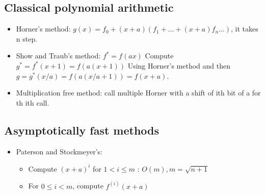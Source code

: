 \documentclass[a4paper,12pt]{article}
\begin{document}
\subsection{Classical polynomial arithmetic}

\begin{itemize}
    \item Horner's method: \(g(x)=f_0 + (x+a) (f_1+...+(x+a)f_n...)\), it takes n step.

    \item Show and Traub's method: 
    \(f^{*}=f(ax)\)
    Compute \(g^{*}=f^{*}(x+1)=f(a(x+1))\) Using Horner's method
    and then \(g=g^{*}(x/a)=f(a(x/a + 1)) = f(x+a)\).

    \item Multiplication free method: call multiple Horner with a shift of ith bit of a for th ith call.
\end{itemize}

\subsection{Asymptotically fast methods}
\begin{itemize}
    \item Paterson and Stockmeyer's: 
            \begin{itemize}
                \item Compute \((x+a)^i\) for \(1<i \leq m\) : \(O(m), m=\sqrt{n+1}\)
                \item For \(0 \leq i < m\), compute \(f^{(i)}(x+a)\)
            \end{itemize}
\end{itemize}
\end{document}
